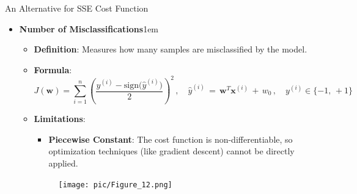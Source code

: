 \documentclass[serif, aspectratio=169]{beamer}
\begin{document}
    \begin{frame}{An Alternative for SSE Cost Function}
        \begin{itemize}
            \item \textbf{Number of Misclassifications}\itemsep1em
            \medskip
            \begin{itemize}\itemsep0.8em
            \item \textbf{Definition}:
            Measures how many samples are misclassified by the model.
            \item \textbf{Formula}:
            \[
                J(\mathbf{w}) = \sum_{i=1}^{n} (\frac{y^{(i)} - \text{sign(\(\hat{y}^{(i)})\)}}{2})^2 \, , \quad \hat{y}^{(i)} \, = \, \mathbf{w}^T\mathbf{x}^{(i)} \, + \, w_0 \, , \quad y^{(i)} \in \{-1, \, +1\}
            \]
            \item \textbf{Limitations}: \\
            \begin{itemize}
                \item \justifying \textbf{Piecewise Constant}:
                The cost function is non-differentiable, so optimization techniques (like gradient descent) cannot be directly applied.
            \end{itemize}
            \endminipage
            \hspace{1cm}
            \begin{figure}[bh]
                \texttt{[image: pic/Figure\_12.png]}
            \end{figure}
            \endminipage
            \end{itemize}
        \end{itemize}
        \vfill
    \end{frame}
\end{document}
